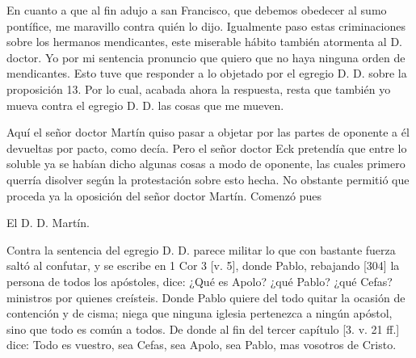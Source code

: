 En cuanto a que al fin adujo a san Francisco, que debemos obedecer al sumo pontífice, me maravillo contra quién lo dijo. Igualmente paso estas criminaciones sobre los hermanos mendicantes, este miserable hábito también atormenta al D. doctor. Yo por mi sentencia pronuncio que quiero que no haya ninguna orden de mendicantes. Esto tuve que responder a lo objetado por el egregio D. D. sobre la proposición 13. Por lo cual, acabada ahora la respuesta, resta que también yo mueva contra el egregio D. D. las cosas que me mueven.

Aquí el señor doctor Martín quiso pasar a objetar por las partes de oponente a él devueltas por pacto, como decía. Pero el señor doctor Eck pretendía que entre lo soluble ya se habían dicho algunas cosas a modo de oponente, las cuales primero querría disolver según la protestación sobre esto hecha. No obstante permitió que proceda ya la oposición del señor doctor Martín. Comenzó pues

El D. D. Martín.

Contra la sentencia del egregio D. D. parece militar lo que con bastante fuerza saltó al confutar, y se escribe en 1 Cor 3 [v. 5], donde Pablo, rebajando [304] la persona de todos los apóstoles, dice: ¿Qué es Apolo? ¿qué Pablo? ¿qué Cefas? ministros por quienes creísteis. Donde Pablo quiere del todo quitar la ocasión de contención y de cisma; niega que ninguna iglesia pertenezca a ningún apóstol, sino que todo es común a todos. De donde al fin del tercer capítulo [3. v. 21 ff.] dice: Todo es vuestro, sea Cefas, sea Apolo, sea Pablo, mas vosotros de Cristo.

